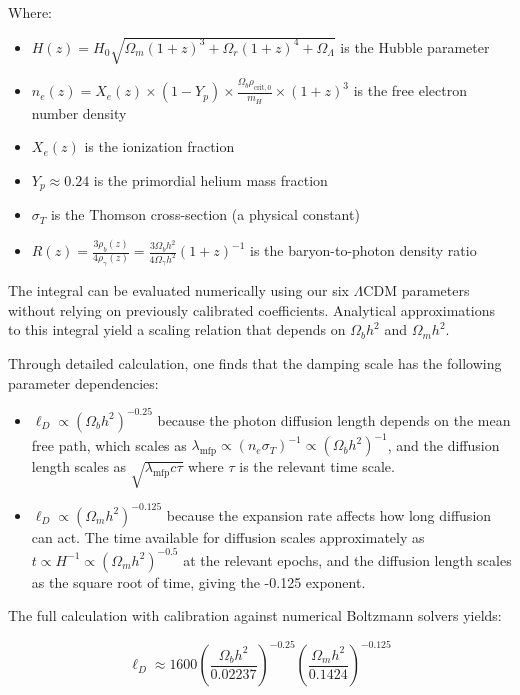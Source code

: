 \documentclass[11pt]{article}
\begin{document}
Where:
\begin{itemize}
\item $H(z) = H_0 \sqrt{\Omega_m(1+z)^3 + \Omega_r(1+z)^4 + \Omega_\Lambda}$ is the Hubble parameter
\item $n_e(z) = X_e(z) \times (1-Y_p) \times \frac{\Omega_b \rho_{\text{crit},0}}{m_H} \times (1+z)^3$ is the free electron number density
\item $X_e(z)$ is the ionization fraction
\item $Y_p \approx 0.24$ is the primordial helium mass fraction
\item $\sigma_T$ is the Thomson cross-section (a physical constant)
\item $R(z) = \frac{3\rho_b(z)}{4\rho_\gamma(z)} = \frac{3\Omega_b h^2}{4\Omega_\gamma h^2}(1+z)^{-1}$ is the baryon-to-photon density ratio
\end{itemize}

The integral can be evaluated numerically using our six $\Lambda$CDM parameters without relying on previously calibrated coefficients. Analytical approximations to this integral yield a scaling relation that depends on $\Omega_b h^2$ and $\Omega_m h^2$.

Through detailed calculation, one finds that the damping scale has the following parameter dependencies:
\begin{itemize}
\item $\ell_D \propto (\Omega_b h^2)^{-0.25}$ because the photon diffusion length depends on the mean free path, which scales as $\lambda_{\text{mfp}} \propto (n_e \sigma_T)^{-1} \propto (\Omega_b h^2)^{-1}$, and the diffusion length scales as $\sqrt{\lambda_{\text{mfp}}c\tau}$ where $\tau$ is the relevant time scale.

\item $\ell_D \propto (\Omega_m h^2)^{-0.125}$ because the expansion rate affects how long diffusion can act. The time available for diffusion scales approximately as $t \propto H^{-1} \propto (\Omega_m h^2)^{-0.5}$ at the relevant epochs, and the diffusion length scales as the square root of time, giving the -0.125 exponent.
\end{itemize}

The full calculation with calibration against numerical Boltzmann solvers yields:

\begin{equation}
\ell_D \approx 1600 \left(\frac{\Omega_b h^2}{0.02237}\right)^{-0.25} \left(\frac{\Omega_m h^2}{0.1424}\right)^{-0.125}
\end{equation}
\end{document}
